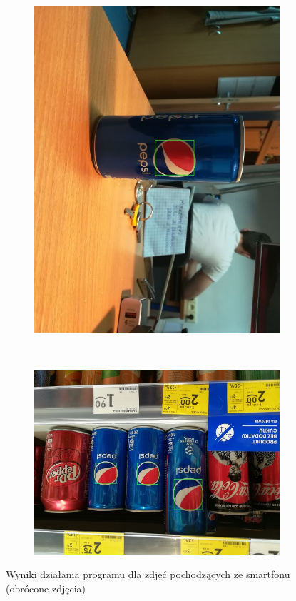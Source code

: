 \documentclass[11pt,a4paper,twoside]{report}
\begin{document}
\begin{figure}
\begin{subfigure}[b]{0.48\textwidth}
	        \includegraphics[width=\textwidth]{img/camera/14}
	    \end{subfigure}
	    \\
	    \begin{subfigure}[b]{0.8\textwidth}
	        \includegraphics[width=\textwidth]{img/camera/13}
	    \end{subfigure}
	    \caption{Wyniki działania programu dla zdjęć pochodzących ze smartfonu (obrócone zdjęcia)}
	    \label{fig:smartfon-2}
	\end{figure}
\end{document}
